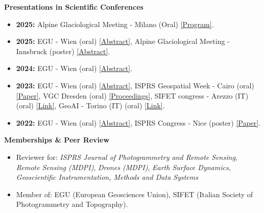 \documentclass{cv_style} %
\begin{document}
\vspace{4pt}
\textbf{Presentations in Scientific Conferences}
\begin{itemize}[nosep]

    \item \textbf{2025:} Alpine Glaciological Meeting - Milano (Oral) \href{https://www.geo.uzh.ch/en/units/rse/news/alpine-glaciology-meeting-2024.html}{[Program]}.

    \item \textbf{2025:} EGU - Wien (oral) \href{https://meetingorganizer.copernicus.org/EGU25/EGU25-15978.html}{[Abstract]}{,} Alpine Glaciological Meeting - Innsbruck (poster) \href{https://www.geo.uzh.ch/en/units/rse/news/alpine-glaciology-meeting-2024.html}{[Abstract]}.

    \item \textbf{2024:} EGU - Wien (oral) \href{https://meetingorganizer.copernicus.org/EGU24/EGU24-16412.html}{[Abstract]}.

    \item \textbf{2023:} EGU - Wien (oral) \href{https://meetingorganizer.copernicus.org/EGU23/EGU23-10018.html}{[Abstract]}{,} ISPRS Geospatial Week - Cairo (oral) \href{https://doi.org/10.5194/isprs-archives-XLVIII-1-W2-2023-1037-2023}{[Paper]}{,} VGC Dresden (oral) \href{https://doi.org/10.25368/2023.194}{[Proceedings]}{,} SIFET congress - Arezzo (IT) (oral) \href{https://www.sifet.org/convengo-2023}{[Link]}{,}  GeoAI - Torino (IT) (oral) \href{https://sites.google.com/view/geo-ai-2023/home}{[Link]}.

    \item \textbf{2022:} EGU - Wien (oral) \href{https://meetingorganizer.copernicus.org/EGU22/EGU22-7967.html}{[Abstract]}{,} ISPRS Congress - Nice (poster) \href{https://doi.org/10.5194/isprs-archives-XLIII-B2-2022-1025-2022}{[Paper]}.
\end{itemize}

\vspace{6pt}
\textbf{Memberships \& Peer Review}
\begin{itemize}[nosep]
    \item Reviewer for: \textit{ISPRS Journal of Photogrammetry and Remote Sensing}, \textit{Remote Sensing
              (MDPI)}, \textit{Drones (MDPI)}, \textit{Earth Surface Dynamics}, \textit{Geoscientific
              Instrumentation, Methods and Data Systems}

    \item Member of: EGU (European Geosciences Union), SIFET (Italian Society of Photogrammetry and
          Topography).
\end{itemize}
\vspace{4pt}
\end{document}
